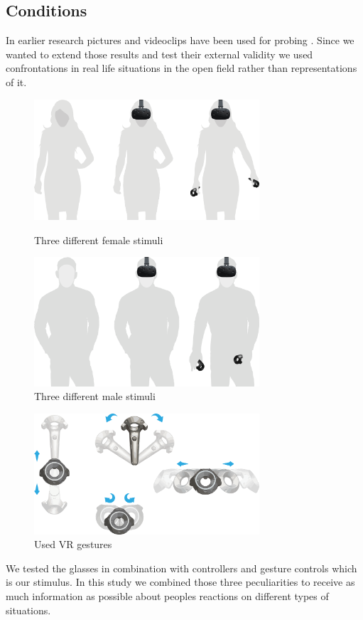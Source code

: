 \documentclass[sigchi]{acmart}
\begin{document}
\subsection{Conditions}

In earlier research pictures and videoclips have been used for probing \cite{schwind2018virtual}. Since we wanted to extend those results and test their external validity we used confrontations in real life situations in the open field rather than representations of it.

\begin{figure}[h]
\includegraphics[width=84mm]{female_stimuli.png} 
\caption{Three different female stimuli}
\includegraphics[width=84mm]{male_stimuli.png} 
\caption{Three different male stimuli}
\end{figure}

\begin{figure}[h]
\includegraphics[width=84mm]{vr_gestures.png} 
\caption{Used VR gestures}
\end{figure}

We tested the glasses in combination with controllers and gesture controls which is our stimulus. In this study we combined those three peculiarities to receive as much information as possible about peoples reactions on different types of situations.
\end{document}
